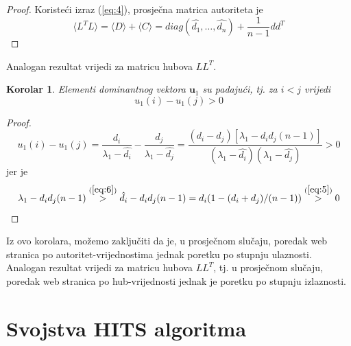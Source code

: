 \documentclass[11pt]{article}
\newtheorem{corollary}{Korolar}[theorem]
\begin{document}
\begin{proof}
Koristeći izraz (\ref{eq:4}), prosječna matrica autoriteta je
\begin{equation}
\langle L^{T}L\rangle = \langle D \rangle + \langle C \rangle = diag(\hat{d_{1}}, \dots , \hat{d_{n}}) + \frac{1}{n-1} dd^{T}
\end{equation}
\end{proof}
Analogan rezultat vrijedi za matricu hubova $LL^{T}$.
\begin{corollary}
Elementi dominantnog vektora $\textbf{u}_1$ su padajući, tj. za $i<j$ vrijedi 
\begin{equation}
u_{1}(i)-u_{1}(j)>0
\end{equation}
\end{corollary}
\begin{proof}
\begin{equation}
u_{1}(i)-u_{1}(j) = \frac{d_{i}}{\lambda_{1} - \hat{d_{i}}} - \frac{d_{j}}{\lambda_{1} - \hat{d_{j}}} = \frac{(d_{i}-d_{j})[\lambda_{1}-d_{i}d_{j}(n-1)]}{(\lambda_{1}-\hat{d_{i}})(\lambda_{1}-\hat{d_{j}})} >0
\end{equation}
jer je
\begin{equation}
\lambda_{1} - d_{i}d_{j}(n-1) \overset{\mathrm{(\ref{eq:6})}}{>}\hat{d_{i}} - d_{i}d_{j}(n-1) = d_{i}(1-(d_{i}+d_{j})/(n-1))\overset{\mathrm{(\ref{eq:5})}} {>}0
\end{equation}
\end{proof}
Iz ovo korolara, možemo zaključiti da je, u prosječnom slučaju, poredak web stranica po autoritet-vrijednostima jednak poretku po stupnju ulaznosti.\\
Analogan rezultat vrijedi za matricu hubova $LL^{T}$, tj. u prosječnom slučaju, poredak web stranica po hub-vrijednosti jednak je poretku po stupnju izlaznosti.

\newpage

\section{Svojstva HITS algoritma}
\end{document}
